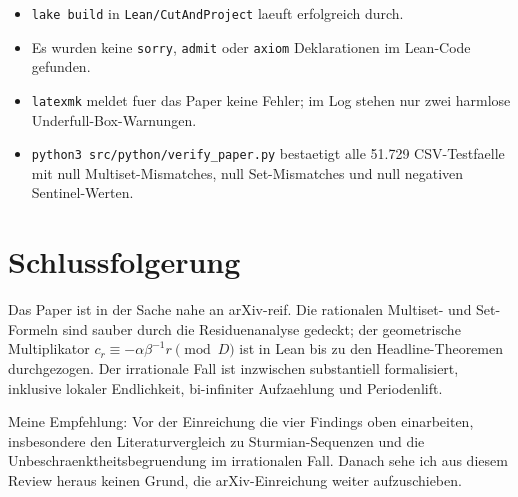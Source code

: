 \documentclass[11pt]{article}
\begin{document}
\begin{itemize}
    \item \texttt{lake build} in \texttt{Lean/CutAndProject} laeuft
    erfolgreich durch.
    \item Es wurden keine \texttt{sorry}, \texttt{admit} oder \texttt{axiom}
    Deklarationen im Lean-Code gefunden.
    \item \texttt{latexmk} meldet fuer das Paper keine Fehler; im Log stehen
    nur zwei harmlose Underfull-Box-Warnungen.
    \item \texttt{python3 src/python/verify\_paper.py} bestaetigt alle
    51.729 CSV-Testfaelle mit null Multiset-Mismatches, null
    Set-Mismatches und null negativen Sentinel-Werten.
\end{itemize}

\section*{Schlussfolgerung}

Das Paper ist in der Sache nahe an arXiv-reif. Die rationalen Multiset- und
Set-Formeln sind sauber durch die Residuenanalyse gedeckt; der geometrische
Multiplikator \(c_r\equiv-\alpha\beta^{-1}r\pmod D\) ist in Lean bis zu den
Headline-Theoremen durchgezogen. Der irrationale Fall ist inzwischen
substantiell formalisiert, inklusive lokaler Endlichkeit, bi-infiniter
Aufzaehlung und Periodenlift.

Meine Empfehlung: Vor der Einreichung die vier Findings oben einarbeiten,
insbesondere den Literaturvergleich zu Sturmian-Sequenzen und die
Unbeschraenktheitsbegruendung im irrationalen Fall. Danach sehe ich aus
diesem Review heraus keinen Grund, die arXiv-Einreichung weiter
aufzuschieben.
\end{document}
